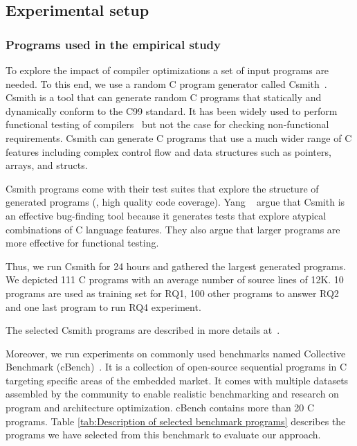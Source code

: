 \subsection{Experimental setup}
\subsubsection{Programs used in the empirical study}
To explore the impact of compiler optimizations a set of input programs are needed. 
To this end, we use a random C program generator called Csmith~\cite{yang2011finding}.
Csmith is a tool that can generate random C programs that statically and dynamically conform to the C99 standard. It has been widely used to perform functional testing of compilers~\cite{chen2016empirical,le2014compiler,nagai2013scaling} but not the case for checking non-functional requirements. Csmith can generate C programs that use a much wider range of C features including complex control flow and data structures such as pointers, arrays, and structs. 

Csmith programs come with their test suites that explore the structure of generated programs (\ie, high quality code coverage).
Yang \etal~\cite{yang2011finding} argue that Csmith is an effective bug-finding tool because it generates tests that explore atypical combinations of C language features. They also argue that larger programs are more effective for functional testing. 

Thus, we run Csmith for 24 hours and gathered the largest generated programs. We depicted 111 C programs with an average number of source lines of 12K. 10 programs are used as training set for RQ1, 100 other programs to answer RQ2 and one last program to run RQ4 experiment.

The selected Csmith programs are described in more details at~\cite{mboussaa}.



Moreover, we run experiments on commonly used benchmarks named Collective Benchmark (cBench)~\cite{fursin2009collective}. It is a collection of open-source sequential programs in C targeting specific areas of the embedded market. It comes with multiple datasets assembled by the community to enable realistic benchmarking and research on program and architecture optimization. cBench contains more than 20 C programs. Table \ref{tab:Description of selected benchmark programs} describes the programs we have selected from this benchmark to evaluate our approach.

